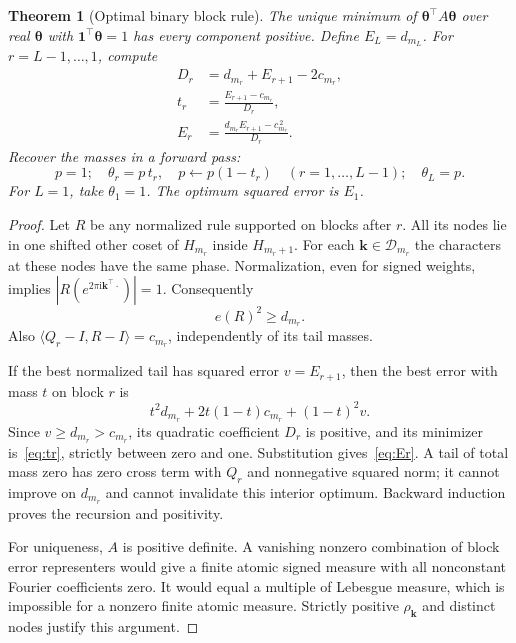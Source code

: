 \documentclass[11pt]{article}
\newtheorem{theorem}[proposition]{Theorem}
\newcommand{\ii}{\mathrm{i}}
\newcommand{\bbone}{\boldsymbol{1}}
\newcommand{\btheta}{\boldsymbol{\theta}}
\newcommand{\bk}{\boldsymbol{k}}
\begin{document}
\begin{theorem}[Optimal binary block rule]\label{thm:recursion}
The unique minimum of $\btheta^\top A\btheta$ over real $\btheta$ with
$\bbone^\top\btheta=1$ has every component positive.
Define $E_L=d_{m_L}$. For $r=L-1,\ldots,1$, compute
\begin{align}
 D_r&=d_{m_r}+E_{r+1}-2c_{m_r},\label{eq:denom}\\
 t_r&=\frac{E_{r+1}-c_{m_r}}{D_r},\label{eq:tr}\\
 E_r&=\frac{d_{m_r}E_{r+1}-c_{m_r}^{\,2}}{D_r}.\label{eq:Er}
\end{align}
Recover the masses in a forward pass:
\[
 p=1;\quad \theta_r=p\,t_r,\quad p\leftarrow p(1-t_r)
 \quad(r=1,\ldots,L-1);\quad\theta_L=p.
\]
For $L=1$, take $\theta_1=1$. The optimum squared error is $E_1$.
\end{theorem}
\begin{proof}
Let $R$ be any normalized rule supported on blocks after $r$.
All its nodes lie in one shifted other coset of $H_{m_r}$ inside
$H_{m_r+1}$. For each $\bk\in\mathcal D_{m_r}$ the characters at
these nodes have the same phase. Normalization, even for signed weights,
implies $|R(e^{2\pi\ii\bk^\top\cdot})|=1$.
Consequently
\begin{equation}\label{eq:tail}
 e(R)^2\ge d_{m_r}.
\end{equation}
Also $\langle Q_r-I,R-I\rangle=c_{m_r}$, independently of its tail masses.

If the best normalized tail has squared error $v=E_{r+1}$, then the
best error with mass $t$ on block $r$ is
\[
 t^2d_{m_r}+2t(1-t)c_{m_r}+(1-t)^2v.
\]
Since $v\ge d_{m_r}>c_{m_r}$, its quadratic coefficient $D_r$ is
positive, and its minimizer is~\eqref{eq:tr}, strictly between zero and
one. Substitution gives~\eqref{eq:Er}. A tail of total mass zero has
zero cross term with $Q_r$ and nonnegative squared norm; it cannot
improve on $d_{m_r}$ and cannot invalidate this interior optimum.
Backward induction proves the recursion and positivity.

For uniqueness, $A$ is positive definite. A vanishing nonzero combination
of block error representers would give a finite atomic signed measure
with all nonconstant Fourier coefficients zero. It would equal a
multiple of Lebesgue measure, which is impossible for a nonzero finite
atomic measure. Strictly positive $\rho_{\bk}$ and distinct nodes
justify this argument.
\end{proof}
\end{document}
